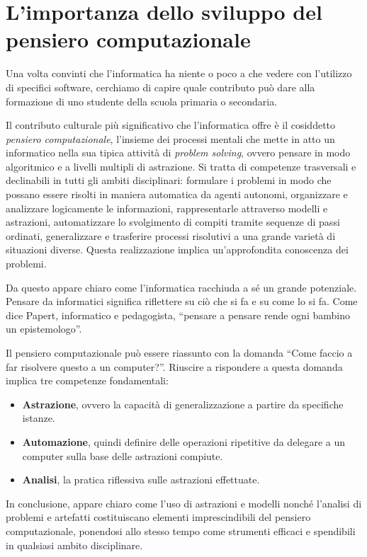 \documentclass[12pt]{article}
\begin{document}
\section{L’importanza dello sviluppo del pensiero computazionale}
Una volta convinti che l’informatica ha niente o poco a che vedere con l’utilizzo di specifici software, cerchiamo di capire quale contributo può dare alla formazione di uno studente della scuola primaria o secondaria.

Il contributo culturale più significativo che l'informatica offre è il cosiddetto \emph{pensiero computazionale}, l'insieme dei processi mentali che mette in atto un informatico nella sua tipica attività di \emph{problem solving}, ovvero pensare in modo algoritmico e a livelli multipli di astrazione. Si tratta di competenze trasversali e declinabili in tutti gli ambiti disciplinari: formulare i problemi in modo che possano essere risolti in maniera automatica da agenti autonomi, organizzare e analizzare logicamente le informazioni, rappresentarle attraverso modelli e astrazioni, automatizzare lo svolgimento di compiti tramite sequenze di passi ordinati, generalizzare e trasferire processi risolutivi a una grande varietà di situazioni diverse. Questa realizzazione implica un'approfondita conoscenza dei problemi.

Da questo appare chiaro come l'informatica racchiuda a sé un grande potenziale. Pensare da informatici significa riflettere su ciò che si fa e su come lo si fa. Come dice Papert, informatico e pedagogista, ``pensare a pensare rende ogni bambino un epistemologo''.

Il pensiero computazionale può essere riassunto con la domanda ``Come faccio a far risolvere questo a un computer?''. Riuscire a rispondere a questa domanda implica tre competenze fondamentali:
\begin{itemize}
\item
\textbf{Astrazione}, ovvero la capacità di generalizzazione a partire da specifiche istanze.
\item
\textbf{Automazione}, quindi definire delle operazioni ripetitive da delegare a un computer sulla base delle astrazioni compiute.
\item
\textbf{Analisi}, la pratica riflessiva sulle astrazioni effettuate.
\end{itemize}
In conclusione, appare chiaro come l'uso di astrazioni e modelli nonché l'analisi di problemi e artefatti costituiscano elementi imprescindibili del pensiero computazionale, ponendosi allo stesso tempo come strumenti efficaci e spendibili in qualsiasi ambito disciplinare.
\end{document}
